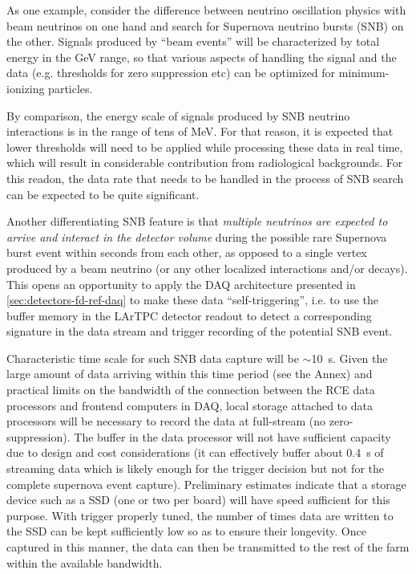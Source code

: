 As one example, consider the difference between
neutrino oscillation physics with beam neutrinos on one hand and search for
Supernova neutrino bursts (SNB) on the other.  Signals produced by
``beam events'' will be characterized by total energy in the GeV
range, so that various aspects of handling the signal and the data (e.g. thresholds for zero suppression etc)
can be optimized for  minimum-ionizing particles.

By comparison, the energy scale of signals
produced by SNB neutrino interactions is in the range of tens of MeV.
For that reason, it is expected that lower thresholds will need to be applied while processing these data in real time,
which will result in considerable contribution from radiological backgrounds.
For this readon, the data rate that needs
to be handled in the process of SNB search can be expected to be quite significant. 

Another differentiating SNB feature is that \textit{multiple neutrinos are
  expected to arrive and interact in the detector volume} during the
possible rare Supernova burst event within seconds from each other, as
opposed to a single vertex produced by a beam neutrino (or any other
localized interactions and/or decays). This opens an opportunity to apply the DAQ architecture
presented in \ref{sec:detectors-fd-ref-daq} to make these data ``self-triggering'', i.e.
to use the buffer memory in the LArTPC detector readout to detect a corresponding
signature in the data stream and trigger recording of the potential SNB event.

Characteristic
time scale for such SNB data capture will be $\sim$\SI{10}{\second}.
Given the large amount of
data arriving within this time period (see the Annex) and practical limits on the bandwidth of
the connection between the RCE data processors and frontend computers in DAQ, local
storage attached to data processors will be necessary to record the
data at full-stream (no zero-suppression).
The buffer
in the data processor will not have sufficient capacity due to design and cost considerations (it can effectively
buffer about \SI{0.4}{\second} of streaming data which is likely enough for the trigger decision but not for the complete
supernova event capture).
Preliminary estimates indicate that a storage device such as a SSD (one or two per board) will have
speed sufficient for this purpose.
With trigger properly tuned, the number of times data are written to
the SSD can be kept sufficiently low so as to ensure their
longevity.
Once captured in this manner, the data can then be
transmitted to the rest of the farm within the available bandwidth.

